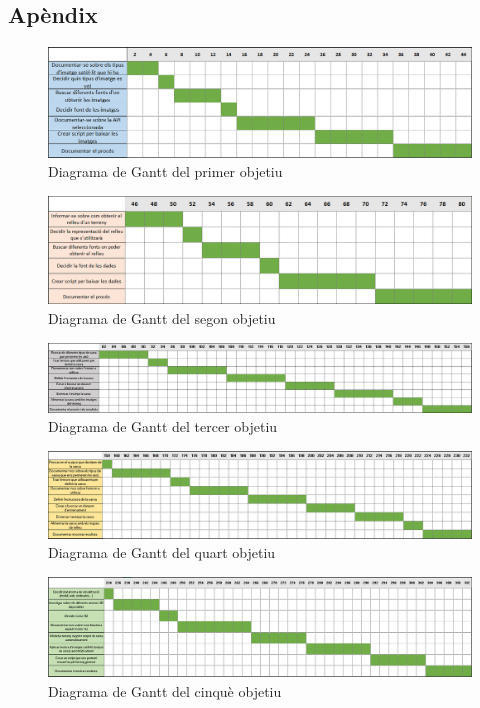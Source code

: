 ﻿\documentclass[10pt,a4paper,twocolumn,twoside]{article}
\begin{document}
\clearpage
\onecolumn
\begin{appendix}
\appendix
\section{Apèndix}

\begin{figure}[H]
\centering
\includegraphics[width=\textwidth]{img/diagrama1.png}
\caption{Diagrama de Gantt del primer objetiu}
\label{fig:diagrama1}
\end{figure}

 \begin{figure}[H]
\centering
\includegraphics[width=\textwidth]{img/diagrama2.png}
\caption{Diagrama de Gantt del segon objetiu}
\label{fig:diagrama2}
\end{figure}

\begin{figure}[H]
\includegraphics[width=\textwidth]{img/diagrama3.png}
\caption{Diagrama de Gantt del tercer objetiu}
\label{fig:diagrama3}
\end{figure}

 \begin{figure}[H]
\centering
\includegraphics[width=\textwidth]{img/diagrama4.png}
\caption{Diagrama de Gantt del quart objetiu}
\label{fig:diagrama4}
\end{figure}

 \begin{figure}[H]
\centering
\includegraphics[width=\textwidth]{img/diagrama5.png}
\caption{Diagrama de Gantt del cinquè objetiu}
\label{fig:diagrama5}
\end{figure}
\end{appendix}
\end{document}
